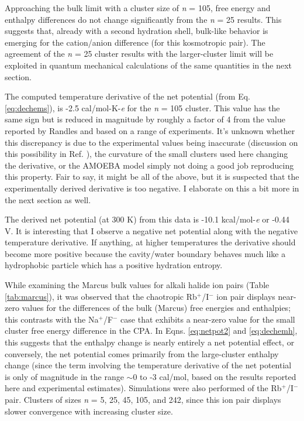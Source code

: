 \begin{cpa}
  Approaching the bulk limit with a cluster size of \emph{n} = 105, free energy and enthalpy differences do not change significantly from the \emph{n} = 25 results. This 
  suggests that, already with a second hydration shell, bulk-like behavior is emerging for the cation/anion difference (for this kosmotropic pair). The agreement of the 
  \emph{n} = 25 cluster results with the larger-cluster limit will be exploited in quantum mechanical calculations of the same quantities in the next section.

  The computed temperature derivative of the net potential (from Eq. \ref{eq:dechems}), is -2.5 cal/mol-K-\emph{e} for the \emph{n} = 105 cluster. This value has the same sign
  but is reduced in magnitude by roughly a factor of 4 from the value reported by Randles\cite{randles1977structure} and \cite{hunenberger2011sp} based on a range of experiments.  
  It's unknown whether this discrepancy is due to the experimental values being inaccurate (discussion on this possibility in Ref. \cite{hunenberger2011sp}), the curvature of
  the small clusters used here changing the derivative, or the AMOEBA model simply not doing a good job reproducing this property. Fair to say, it might be all of the above, but
  it is suspected that the experimentally derived derivative is too negative\cite{donald2010expand_cpa}. I elaborate on this a bit more in the next section as well.

  The derived net potential (at 300 K) from this data is -10.1 kcal/mol-\emph{e} or -0.44 V. It is interesting that I observe a negative net potential along with the negative 
  temperature derivative. If anything, at higher temperatures the derivative should become more positive because the cavity/water boundary behaves much like a hydrophobic 
  particle which has a positive hydration entropy.

  While examining the Marcus bulk values\cite{marcus1985book} for alkali halide ion pairs (Table \ref{tab:marcus}), it was observed that the chaotropic Rb$^+$/I$^-$ ion pair 
  displays near-zero values for the differences of the bulk (Marcus) free energies and enthalpies; this contrasts with the Na$^+$/F$^-$ case that exhibits a near-zero value for 
  the small cluster free energy difference in the CPA\cite{coe1998cpa1}. In Eqns. \ref{eq:netpot2} and \ref{eq:dechemh}, this suggests that the enthalpy change is nearly entirely 
  a net potential effect, or conversely, the net potential comes primarily from the large-cluster enthalpy change (since the term involving the temperature derivative of the net 
  potential is only of magnitude in the range $\sim$0 to -3 cal/mol, based on the results reported here and experimental estimates\cite{randles1977structure}). Simulations were 
  also performed of the Rb$^+$/I$^-$ pair. Clusters of sizes \emph{n} = 5, 25, 45, 105, and 242, since this ion pair displays slower convergence with increasing cluster size. 


\end{cpa}
